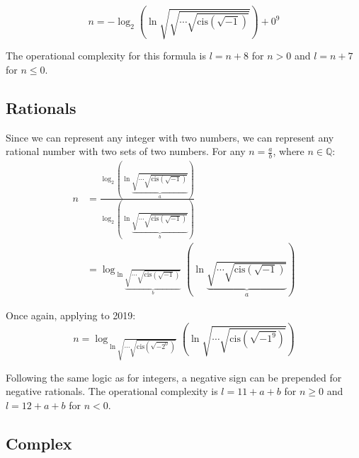 \begin{equation}
  n = -\log_2\left( \ln \sqrt{\sqrt{\cdots\sqrt{\mathrm{cis}(\sqrt{-1})}}}\right)+0^9
\end{equation}

The operational complexity for this formula is $l=n+8$ for $n>0$ and $l=n+7$ for $n\leq0$.

\subsection{Rationals}
Since we can represent any integer with two numbers, we can represent any rational number with two sets of two numbers.
For any $n=\frac{a}{b}$, where $n\in\mathbb{Q}$:
\begin{align*}
  n &= \frac{
    \log_2\left(
      \ln \underbrace{\sqrt{\cdots\sqrt{\mathrm{cis}(\sqrt{-1})}}}_{a} 
    \right)
  }{
    \log_2\left(
      \ln \underbrace{\sqrt{\cdots\sqrt{\mathrm{cis}(\sqrt{-1})}}}_{b} 
    \right)
  } \\
  &= \log_{
    \ln \underbrace{\sqrt{\cdots\sqrt{\mathrm{cis}(\sqrt{-1})}}}_{b}
  }
  \left(
    \ln \underbrace{\sqrt{\cdots\sqrt{\mathrm{cis}(\sqrt{-1})}}}_{a}
  \right)
\end{align*}

Once again, applying to 2019:
\begin{equation}
  n = \log_{
    \ln\sqrt{\cdots\sqrt{\mathrm{cis}(\sqrt{-2^0})}}
  }
  \left(
    \ln\sqrt{\cdots\sqrt{\mathrm{cis}(\sqrt{-1^9})}}
  \right)
\end{equation}

Following the same logic as for integers, a negative sign can be prepended for negative rationals. The operational complexity is $l=11+a+b$ for $n\geq0$ and $l=12+a+b$ for $n<0$.

\subsection{Complex}
